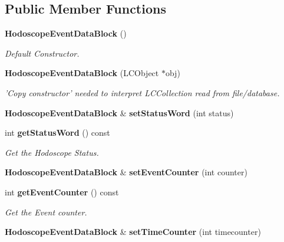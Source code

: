 \subsection*{Public Member Functions}
\begin{DoxyCompactItemize}
\item 
{\bf HodoscopeEventDataBlock} ()\label{classCALICE_1_1HodoscopeEventDataBlock_a737bf8e239af349eee5ff61472f0d181}

\begin{DoxyCompactList}\small\item\em Default Constructor. \item\end{DoxyCompactList}\item 
{\bf HodoscopeEventDataBlock} (LCObject $\ast$obj)\label{classCALICE_1_1HodoscopeEventDataBlock_ab99ff6344343b01653080763d612294a}

\begin{DoxyCompactList}\small\item\em 'Copy constructor' needed to interpret LCCollection read from file/database. \item\end{DoxyCompactList}\item 
{\bf HodoscopeEventDataBlock} \& {\bfseries setStatusWord} (int status)\label{classCALICE_1_1HodoscopeEventDataBlock_a8c84a40787e11df246f568c9a71ceee3}

\item 
int {\bf getStatusWord} () const \label{classCALICE_1_1HodoscopeEventDataBlock_af60190fb30f52df3a5697322a8965381}

\begin{DoxyCompactList}\small\item\em Get the Hodoscope Status. \item\end{DoxyCompactList}\item 
{\bf HodoscopeEventDataBlock} \& {\bfseries setEventCounter} (int counter)\label{classCALICE_1_1HodoscopeEventDataBlock_aa900a9d896467976dd716c3bbab1f99f}

\item 
int {\bf getEventCounter} () const \label{classCALICE_1_1HodoscopeEventDataBlock_a76db2626be9c0cd318bcf1fd0fced760}

\begin{DoxyCompactList}\small\item\em Get the Event counter. \item\end{DoxyCompactList}\item 
{\bf HodoscopeEventDataBlock} \& {\bf setTimeCounter} (int timecounter)\label{classCALICE_1_1HodoscopeEventDataBlock_abb2c7d94d1148d184c54ae66e98c3be4}


\end{DoxyCompactItemize}
